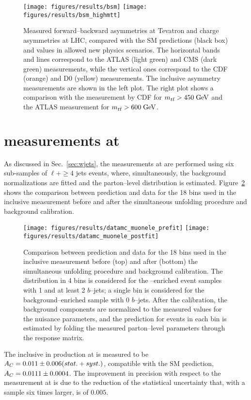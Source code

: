 \begin{figure}[!htb]
  \centering
  \texttt{[image: figures/results/bsm]}
  \texttt{[image: figures/results/bsm\_highmtt]}
  \caption{Measured forward--backward asymmetries \afb{} at Tevatron
    and charge asymmetries \ac{} at LHC, compared with the SM
    predictions (black box) and values in allowed new physics
    scenarios. The horizontal bands and lines correspond to the ATLAS
    (light green) and CMS (dark green) measurements, while the
    vertical ones correspond to the CDF (orange) and D0 (yellow)
    measurements. The inclusive asymmetry measurements are shown in
    the left plot. The right plot shows a comparison with the \afb{}
    measurement by CDF for $m_{t\bar{t}}{} > 450 \; \mathrm{GeV}{}$ and the ATLAS \ac{}
    measurement for $m_{t\bar{t}}{} > 600 \; \mathrm{GeV}{}$.}
  \label{fig:summarybsm}
\end{figure}


\section{\ac{} measurements at \eighttev{}}
\label{sec:res8tev}

As discussed in Sec.~\ref{sec:wjets}, the measurements at \eighttev{}
are performed using six sub-samples of $\ell{}+\ge4$ jets events,
where, simultaneously, the background normalizations are fitted and
the parton--level \dy{} distribution is
estimated. Figure~\ref{fig:dy8tev} shows the comparison between
prediction and data for the 18 bins used in the inclusive \ac{}
measurement before and after the simultaneous unfolding procedure and
background calibration.
\begin{figure}[!htb]\centering
  \texttt{[image: figures/results/datamc\_muonele\_prefit]} 
  \texttt{[image: figures/results/datamc\_muonele\_postfit]} 
  \caption{Comparison between prediction and data for the 18 bins used
  in the inclusive \ac{} measurement before (top) and after (bottom)
  the simultaneous unfolding procedure and background calibration. The
  \dy{} distribution in 4 bins is considered for the
  \ttbar{}--enriched event samples with 1 and at least 2 $b$--jets; a
  single bin is considered for the background--enriched sample with 0
  $b$--jets. After the calibration, the background components are
  normalized to the measured values for the nuisance parameters, and
  the prediction for \ttbar{} events in each bin is estimated by
  folding the measured parton--level parameters through the response
  matrix.}
  \label{fig:dy8tev}
\end{figure}
The inclusive \ac{} in \ttbar{} production at \eighttev{} is measured to be
$A_C{}= 0.011\pm0.006(stat.+syst.)$, compatible with the SM prediction,
$A_C{}=0.0111\pm0.0004$. The improvement in precision with respect to
the measurement at \seventev{} is due to the reduction of the
statistical uncertainty that, with a \ttbar{} sample six times larger,
is of $0.005$. 

